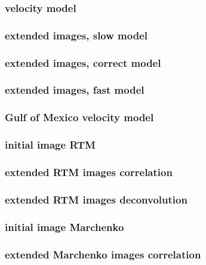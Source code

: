 
\begin{frame}\frametitle{velocity model}
\end{frame}

\begin{frame}  \frametitle{extended images, slow model\hfill }
\end{frame}

\begin{frame} \frametitle{extended images, correct model \hfill }
\end{frame}

\begin{frame} \frametitle{extended images, fast model\hfill }
\end{frame}


\begin{frame}
\end{frame}
\begin{frame}\frametitle{ Gulf of Mexico velocity model }
\end{frame}

\begin{frame}\frametitle{initial image \hfill RTM }
\end{frame}

\begin{frame}\frametitle{extended RTM images  \hfill correlation }
\end{frame}

\begin{frame}\frametitle{extended RTM images  \hfill deconvolution }
\end{frame}


\begin{frame}\frametitle{initial image \hfill Marchenko }
\end{frame}

\begin{frame}\frametitle{extended Marchenko images  \hfill correlation }
\end{frame}

